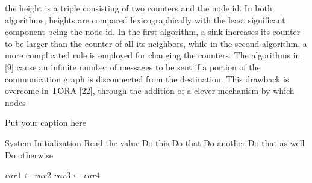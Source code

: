 the height is a triple consisting of two counters and the node id. In both algorithms,
heights are compared lexicographically with the least significant component being
the node id. In the first algorithm, a sink increases its counter to be larger than the
counter of all its neighbors, while in the second algorithm, a more complicated rule
is employed for changing the counters.
The algorithms in [9] cause an infinite number of messages to be sent if a portion
of the communication graph is disconnected from the destination. This drawback is
overcome in TORA [22], through the addition of a clever mechanism by which nodes
\begin{algorithm}
\caption{Put your caption here}
\begin{algorithmic}[1]

    \State System Initialization
    \State Read the value 
        \State Do this
        \State Do that
        \State Do another
        \State Do that as well
        \Else
        \State Do otherwise
        \EndIf
    \EndIf

      
        \State $var1 \leftarrow var2$  
        \State $var3 \leftarrow var4$
    \EndWhile  \label{roy's loop}

\end{algorithmic}
\end{algorithm}
